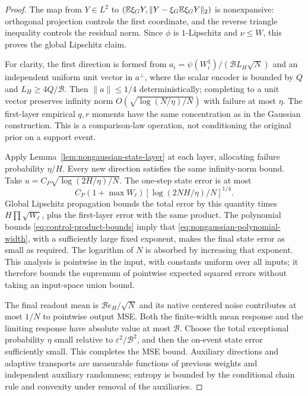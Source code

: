 \begin{proof}
The map from $Y\in L^2$ to
$(\mathbb E\xi_GY,\|Y-\xi_G\mathbb E\xi_GY\|_2)$ is nonexpansive: orthogonal
projection controls the first coordinate, and the reverse triangle
inequality controls the residual norm. Since $\phi$ is
$1$-Lipschitz and $\nu\le W$, this proves the global Lipschitz claim.

For clarity, the first direction is formed from
$a_i=\psi(W_i^1)/(\mathcal B L_H\sqrt N)$ and an independent uniform
unit vector in $a^\perp$, where the scalar encoder is bounded by
$Q$ and $L_H\ge4Q/\mathcal B$. Then $\|a\|\le1/4$ deterministically;
completing to a unit vector preserves infinity norm
$O(\sqrt{\log(N/\eta)/N})$ with failure at most $\eta$.
The first-layer empirical $q,r$ moments have the same concentration
as in the Gaussian construction. This is a comparison-law operation,
not conditioning the original prior on a support event.

Apply Lemma~\ref{lem:nongaussian-state-layer} at each layer, allocating
failure probability $\eta/H$. Every new direction satisfies the
same infinity-norm bound. Take
$u=C_P\sqrt{\log(2H/\eta)/N}$.
The one-step state error is at most
\[
 C_P(1+\max W_\ell)
       [\log(2NH/\eta)/N]^{1/4}.
\]
Global Lipschitz propagation bounds the total error by this quantity
times $H\prod\sqrt{W_\ell}$, plus the first-layer error with the
same product. The polynomial bounds
\eqref{eq:control-product-bounds} imply that
\eqref{eq:nongaussian-polynomial-width}, with a sufficiently large
fixed exponent, makes the final state error as small as required.
The logarithm of $N$ is absorbed by increasing that exponent.
This analysis is pointwise in the input, with constants uniform over
all inputs; it therefore bounds the supremum of pointwise expected
squared errors without taking an input-space union bound.

The final readout mean is $\mathcal B e_H/\sqrt N$ and its native
centered noise contributes at most $1/N$ to pointwise output MSE.
Both the finite-width mean response and the limiting response have
absolute value at most $\mathcal B$. Choose the total exceptional
probability $\eta$ small relative to $\varepsilon^2/\mathcal B^2$,
and then the on-event state error sufficiently small. This completes
the MSE bound. Auxiliary directions and adaptive transports are
measurable functions of previous weights and independent auxiliary
randomness; entropy is bounded by the conditional chain rule and
convexity under removal of the auxiliaries.
\end{proof}
